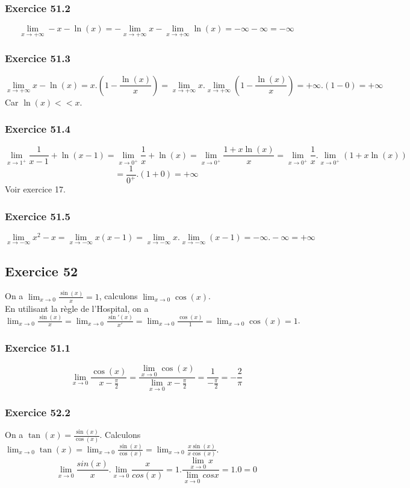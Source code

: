 \documentclass[]{book}
\theoremstyle{definition}
\begin{document}
\subsubsection*{Exercice 51.2}
$$\lim_{x\to+\infty}-x-\ln(x) = -\lim_{x\to+\infty}x - \lim_{x\to+\infty} \ln(x) = -\infty -\infty = -\infty  $$

\subsubsection*{Exercice 51.3}
$$\lim_{x\to+\infty}x-\ln(x) = x.(1-\frac{\ln(x)}{x}) = \lim_{x\to+\infty}x.\lim_{x\to+\infty}(1-\frac{\ln(x)}{x}) = +\infty.(1-0) = +\infty$$
Car $\ln(x) << x$.

\subsubsection*{Exercice 51.4}
$$\lim_{x\to1^{+}}\frac{1}{x-1}+\ln(x-1) = \lim_{x\to0^{+}}\frac{1}{x}+\ln(x) = \lim_{x\to0^{+}}\frac{1+x\ln(x)}{x} = \lim_{x\to0^{+}}\frac{1}{x}.\lim_{x\to0^{+}}(1+x\ln(x))$$
$$=\frac{1}{0^+}.(1+0) = +\infty$$
Voir exercice 17.

\subsubsection*{Exercice 51.5}
$$\lim_{x\to-\infty}x^2-x = \lim_{x\to-\infty}x(x-1) = \lim_{x\to-\infty}x.\lim_{x\to-\infty}(x-1) = -\infty.-\infty = +\infty$$


\subsection*{Exercice 52}
On a $\lim_{x\to0}\frac{\sin(x)}{x} = 1$, calculons $\lim_{x\to0}\cos(x)$.\\
En utilisant la r\`egle de l'Hospital, on a $\lim_{x\to0}\frac{\sin(x)}{x} = \lim_{x\to0}\frac{\sin'(x)}{x'} = \lim_{x\to0}\frac{\cos(x)}{1} = \lim_{x\to0}\cos(x) = 1$.\\


\subsubsection*{Exercice 51.1}
$$\lim_{x\to0}\frac{\cos(x)}{x-\frac{\pi}{2}} = \frac{\lim_{x\to0}\cos(x)}{\lim_{x\to0}x-\frac{\pi}{2}}= \frac{1}{-\frac{\pi}{2}} = -\frac{2}{\pi}$$


\subsubsection*{Exercice 52.2}
On a $\tan(x) = \frac{\sin(x)}{\cos(x)}$. Calculons $\lim_{x\to0}\tan(x) = \lim_{x\to0}\frac{\sin(x)}{\cos(x)} = \lim_{x\to0}\frac{x\sin(x)}{x\cos(x)}$.
$$ \lim_{x\to0}\frac{sin(x)}{x}.\lim_{x\to0}\frac{x}{cos(x)} = 1 . \frac{\lim_{x\to0}x}{\lim_{x\to0}cos x} = 1.0 = 0$$
\end{document}
